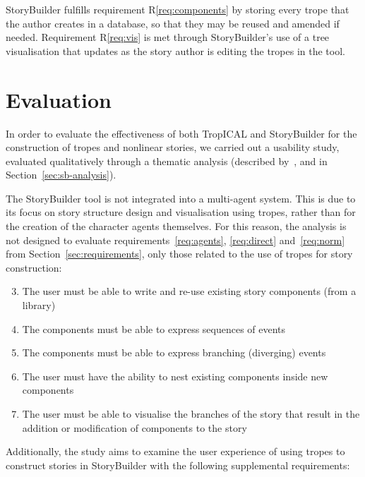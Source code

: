 \documentclass[11pt]{report}
\begin{document}
StoryBuilder fulfills requirement R\ref{req:components} by storing every trope
that the author creates in a database, so that they may be reused and amended if
needed. Requirement R\ref{req:vis} is met through StoryBuilder's use of a tree
visualisation that updates as the story author is editing the tropes in the tool.

\section{Evaluation}
\label{sec:sb-eval}

In order to evaluate the effectiveness of both TropICAL and StoryBuilder for the
construction of tropes and nonlinear stories, we carried out a usability study,
evaluated qualitatively through a thematic analysis (described
by~\citet{clarke2014thematic}, and in Section~\ref{sec:sb-analysis}).

The StoryBuilder tool is not integrated into a multi-agent system. This is due
to its focus on story structure design and visualisation using tropes, rather
than for the creation of the character agents themselves. For this reason, the
analysis is not designed to evaluate requirements~\ref{req:agents},
\ref{req:direct} and~\ref{req:norm} from Section~\ref{sec:requirements}, only
those related to the use of tropes for story construction:

\begin{enumerate}[R1.]
  \setcounter{enumi}{2}
  \item\label{req:components} The user must be able to write and re-use
    existing story components (from a library)
  \item\label{req:sequences} The components must be able to express sequences of
    events
  \item\label{req:branches} The components must be able to express branching
    (diverging) events
  \item\label{req:subtropes} The user must have the ability to nest existing
    components inside new components
  \item\label{req:vis} The user must be able to visualise the branches of the
    story that result in the addition or modification of components to the
    story
\end{enumerate}

Additionally, the study aims to examine the user experience of using tropes to
construct stories in StoryBuilder with the following supplemental requirements:
\end{document}
